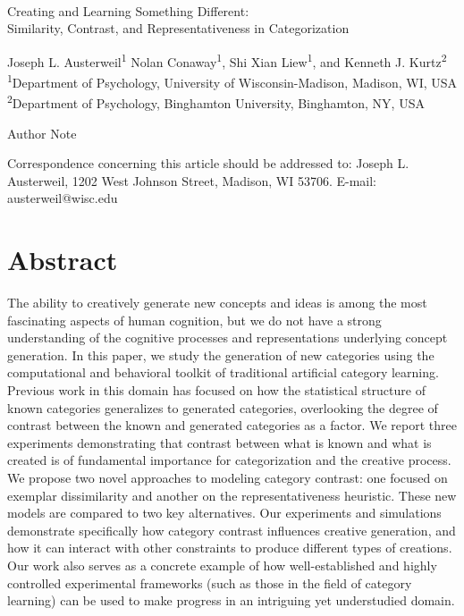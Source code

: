 \documentclass[12pt]{article}
\begin{document}


\begin{center}
\hfill
\\[1in]

Creating and Learning Something Different: \\
Similarity, Contrast, and Representativeness in Categorization


\vfill
Joseph L. Austerweil\textsuperscript{1}
Nolan Conaway\textsuperscript{1}, 
Shi Xian Liew\textsuperscript{1},
and Kenneth J. Kurtz\textsuperscript{2}
\\[\baselineskip]
\textsuperscript{1}Department of Psychology, University of Wisconsin-Madison, Madison, WI, USA
\textsuperscript{2}Department of Psychology, Binghamton University, Binghamton, NY, USA
\\[1in]

\vfill

Author Note

Correspondence concerning this article should be addressed to: 
Joseph L. Austerweil, 1202 West Johnson Street, Madison, WI 53706.
E-mail: austerweil@wisc.edu

\end{center}
\clearpage


\doublespacing
\section*{Abstract}
%
The ability to creatively generate new concepts and ideas is among the most
fascinating aspects of human cognition, but we do not have a strong
understanding of the cognitive processes and representations underlying concept
generation. In this paper, we study the generation of new categories using the
computational and behavioral toolkit of traditional artificial category
learning. Previous work in this domain has focused on how the statistical
structure of known categories generalizes to generated categories, overlooking
the degree of contrast between the known and generated categories as a factor.
We report three experiments demonstrating that contrast between what is known
and what is created is of fundamental importance for categorization and the
creative process. We propose two novel approaches to modeling category contrast:
one focused on exemplar dissimilarity and another on the representativeness
heuristic. These new models are compared to two key alternatives. Our
experiments and simulations demonstrate specifically how category contrast
influences creative generation, and how it can interact with other constraints
to produce different types of creations. Our work also serves as a concrete
example of how well-established and highly controlled experimental frameworks
(such as those in the field of category learning) can be used to make progress
in an intriguing yet understudied domain.
\end{document}
